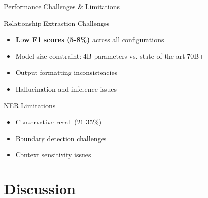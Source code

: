 \documentclass[aspectratio=169, 11pt]{beamer}
\begin{document}
\begin{frame}{Performance Challenges \& Limitations}
    \begin{block}{Relationship Extraction Challenges}
        \begin{itemize}
            \item \textbf{Low F1 scores (5-8\%)} across all configurations
            \item Model size constraint: 4B parameters vs. state-of-the-art 70B+
            \item Output formatting inconsistencies
            \item Hallucination and inference issues
        \end{itemize}
    \end{block}
    
    \begin{block}{NER Limitations}
        \begin{itemize}
            \item Conservative recall (20-35\%)
            \item Boundary detection challenges
            \item Context sensitivity issues
        \end{itemize}
    \end{block}

\end{frame}

\section{Discussion}
\end{document}
